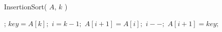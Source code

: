 \documentclass[mathserif]{beamer}
\begin{document}
{%
%
% 
% 
{\sc InsertionSort}( $A$, $k$ ) 
\begin{algorithmic}[1]
	\RETURN;
\ENDIF
{}
\STATE $key = A[k];$ 
\STATE $i = k - 1;$
	\STATE $A[i+1] = A[i];$ 
	\STATE $i--;$
\ENDWHILE
\STATE $A[i+1] = key;$
\end{algorithmic}


%    
% 
% 
% 
%
%  
%
%     
%
%
%
} 
\end{document}
